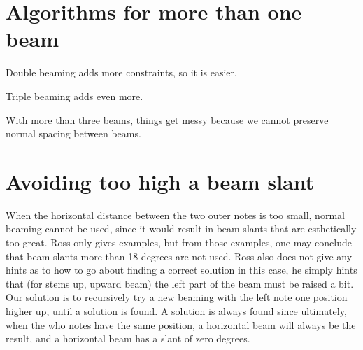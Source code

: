 \section{Algorithms for more than one beam}

Double beaming adds more constraints, so it is easier.

Triple beaming adds even more. 

With more than three beams, things get messy because we cannot
preserve normal spacing between beams. 

\section{Avoiding too high a beam slant}

When the horizontal distance between the two outer notes is too small,
normal beaming cannot be used, since it would result in beam slants
that are esthetically too great.  Ross only gives examples, but from
those examples, one may conclude that beam slants more than 18 degrees
are not used.  Ross also does not give any hints as to how to go about
finding a correct solution in this case, he simply hints that (for
stems up, upward beam) the left part of the beam must be raised a
bit.  Our solution is to recursively try a new beaming with the left
note one position higher up, until a solution is found.  A solution is
always found since ultimately, when the who notes have the same
position, a horizontal beam will always be the result, and a
horizontal beam has a slant of zero degrees. 


